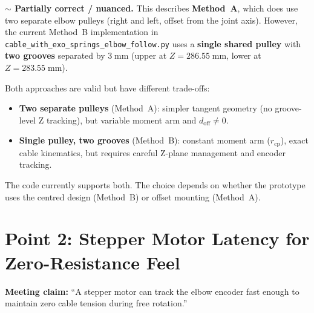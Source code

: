 \documentclass[11pt, a4paper]{article}
\newenvironment{nuanced}{%
  \begin{mdframed}[backgroundcolor=yellow!10, linecolor=orange!60!black]%
  \textbf{\color{orange!60!black}$\sim$\; Partially correct / nuanced.}\;}{\end{mdframed}}
\begin{document}
\begin{nuanced}
This describes \textbf{Method~A}, which does use two separate elbow pulleys
(right and left, offset from the joint axis).  However, the current
Method~B implementation in
\texttt{cable\_with\_exo\_springs\_elbow\_follow.py} uses a
\textbf{single shared pulley} with \textbf{two grooves} separated by
$3\;\text{mm}$ (upper at $Z = 286.55\;\text{mm}$, lower at
$Z = 283.55\;\text{mm}$).

\medskip\noindent
Both approaches are valid but have different trade-offs:
\begin{itemize}[nosep]
  \item \textbf{Two separate pulleys} (Method~A): simpler tangent geometry
    (no groove-level Z tracking), but variable moment arm and
    $d_{\text{off}} \neq 0$.
  \item \textbf{Single pulley, two grooves} (Method~B): constant moment
    arm ($r_{\text{cp}}$), exact cable kinematics, but requires careful
    Z-plane management and encoder tracking.
\end{itemize}

\noindent
The code currently supports both.  The choice depends on whether the
prototype uses the centred design (Method~B) or offset mounting
(Method~A).
\end{nuanced}


\section{Point 2: Stepper Motor Latency for Zero-Resistance Feel}
\label{sec:point2}

\noindent
\textbf{Meeting claim:} ``A stepper motor can track the elbow encoder fast
enough to maintain zero cable tension during free rotation.''
\end{document}
